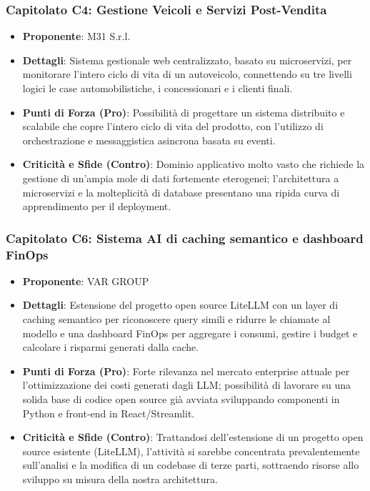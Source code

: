 \subsubsection{Capitolato C4: Gestione Veicoli e Servizi Post-Vendita}
\begin{itemize}
    \item \textbf{Proponente}: M31 S.r.l.

    \item \textbf{Dettagli}: Sistema gestionale web centralizzato, basato su microservizi, per monitorare l'intero ciclo di vita di un autoveicolo, connettendo su tre livelli logici le case automobilistiche, i concessionari e i clienti finali.

    \item \textbf{Punti di Forza (Pro)}: Possibilità di progettare un sistema distribuito e scalabile che copre l'intero ciclo di vita del prodotto, con l'utilizzo di orchestrazione e messaggistica asincrona basata su eventi.

    \item \textbf{Criticità e Sfide (Contro)}: Dominio applicativo molto vasto che richiede la gestione di un'ampia mole di dati fortemente eterogenei; l'architettura a microservizi e la molteplicità di database presentano una ripida curva di apprendimento per il deployment.

\end{itemize}

\subsubsection{Capitolato C6: Sistema AI di caching semantico e dashboard FinOps}
\begin{itemize}
    \item \textbf{Proponente}: VAR GROUP

    \item \textbf{Dettagli}: Estensione del progetto open source LiteLLM con un layer di caching semantico per riconoscere query simili e ridurre le chiamate al modello e una dashboard FinOps per aggregare i consumi, gestire i budget e calcolare i risparmi generati dalla cache.
    \item \textbf{Punti di Forza (Pro)}: Forte rilevanza nel mercato enterprise attuale per l'ottimizzazione dei costi generati dagli LLM; possibilità di lavorare su una solida base di codice open source già avviata sviluppando componenti in Python e front-end in React/Streamlit.

    \item \textbf{Criticità e Sfide (Contro)}: Trattandosi dell'estensione di un progetto open source esistente (LiteLLM), l'attività si sarebbe concentrata prevalentemente sull'analisi e la modifica di un codebase di terze parti, sottraendo risorse allo sviluppo su misura della nostra architettura.

\end{itemize}

